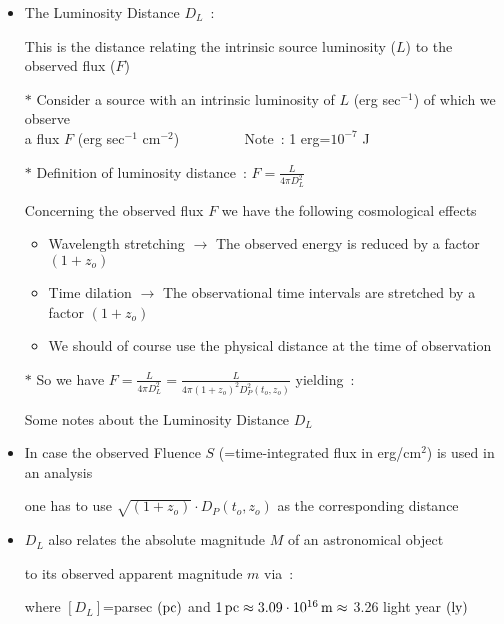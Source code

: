 \Tr
\onecolumn
\begin{itemize}
\item The {\blue Luminosity Distance $D_{L}$}~:
\item[] This is the distance relating the intrinsic source luminosity ($L$) to the observed flux ($F$)
\item[$\ast$] Consider a source with an intrinsic luminosity of $L$ (erg sec$^{-1}$) of which we observe\\
              a flux $F$ (erg sec$^{-1}$ cm$^{-2}$) $\qquad \qquad$ Note~: 1 erg=$10^{-7}$ J
\item[$\ast$] Definition of luminosity distance~: {\blue $\displaystyle F=\frac{L}{4\pi D^{2}_{L}}$}
\item[] Concerning the observed flux $F$ we have the following cosmological effects
\begin{itemize}
\item Wavelength stretching $\rightarrow$ The observed energy is reduced by a factor $(1+z_{o})$
\item Time dilation $\rightarrow$ The observational time intervals are stretched by a factor $(1+z_{o})$
\item We should of course use the physical distance at the time of observation
\end{itemize}
\item[$\ast$] So we have {\blue $\displaystyle F=\frac{L}{4\pi D^{2}_{L}}=
                                  \frac{L}{4\pi (1+z_{o})^{2}D^{2}_{P}(t_{o},z_{o})}$} yielding~:
\item[] \begin{center}
        {\red {}}
        \end{center}
\end{itemize}

\Tr
\onecolumn
\begin{itemize}
\item[] \begin{center}{\red Some notes about the Luminosity Distance $D_{L}$}\end{center}
\item In case the observed {\blue Fluence $S$} (=time-integrated flux in erg/cm$^{2}$) is used in an analysis
\item[] one has to use $\sqrt{(1+z_{o})} \cdot D_P(t_{o},z_{o})$ as the corresponding distance
\item $D_{L}$ also relates the {\blue absolute magnitude $M$} of an astronomical object
\item[] to its observed {\blue apparent magnitude $m$} via~:
\item[] \begin{center}
        {\red {}}
        \end{center}
\item[] where $[D_{L}]$=parsec $({\rm pc})$ and
        $1\,{\rm pc} \approx 3.09 \cdot 10^{16}\,{\rm m} \approx$ 3.26 light year $({\rm ly})$
\end{itemize}